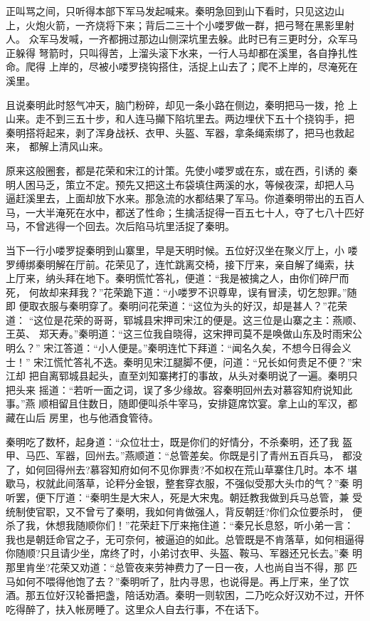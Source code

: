 正叫骂之间，只听得本部下军马发起喊来。秦明急回到山下看时，只见这边山
上，火炮火箭，一齐烧将下来；背后二三十个小喽罗做一群，把弓弩在黑影里射人。
众军马发喊，一齐都拥过那边山侧深坑里去躲。此时已有三更时分，众军马正躲得
弩箭时，只叫得苦，上溜头滚下水来，一行人马却都在溪里，各自挣扎性命。爬得
上岸的，尽被小喽罗挠钩搭住，活捉上山去了；爬不上岸的，尽淹死在溪里。

且说秦明此时怒气冲天，脑门粉碎，却见一条小路在侧边，秦明把马一拨，抢
上山来。走不到三五十步，和人连马攧下陷坑里去。两边埋伏下五十个挠钩手，把
秦明搭将起来，剥了浑身战袄、衣甲、头盔、军器，拿条绳索绑了，把马也救起来，
都解上清风山来。

原来这般圈套，都是花荣和宋江的计策。先使小喽罗或在东，或在西，引诱的
秦明人困马乏，策立不定。预先又把这土布袋填住两溪的水，等候夜深，却把人马
逼赶溪里去，上面却放下水来。那急流的水都结果了军马。你道秦明带出的五百人
马，一大半淹死在水中，都送了性命；生擒活捉得一百五七十人，夺了七八十匹好
马，不曾逃得一个回去。次后陷马坑里活捉了秦明。

当下一行小喽罗捉秦明到山寨里，早是天明时候。五位好汉坐在聚义厅上，小
喽罗缚绑秦明解在厅前。花荣见了，连忙跳离交椅，接下厅来，亲自解了绳索，扶
上厅来，纳头拜在地下。秦明慌忙答礼，便道：“我是被擒之人，由你们碎尸而死，
何故却来拜我？”花荣跪下道：“小喽罗不识尊卑，误有冒渎，切乞恕罪。”随即
便取衣服与秦明穿了。秦明问花荣道：“这位为头的好汉，却是甚人？”花荣道：
“这位是花荣的哥哥，郓城县宋押司宋江的便是。这三位是山寨之主：燕顺、王英、
郑天寿。”秦明道：“这三位我自晓得，这宋押司莫不是唤做山东及时雨宋公明么？”
宋江答道：“小人便是。”秦明连忙下拜道：“闻名久矣，不想今日得会义士！”
宋江慌忙答礼不迭。秦明见宋江腿脚不便，问道：“兄长如何贵足不便？”宋江却
把自离郓城县起头，直至刘知寨拷打的事故，从头对秦明说了一遍。秦明只把头来
摇道：“若听一面之词，误了多少缘故。容秦明回州去对慕容知府说知此事。”燕
顺相留且住数日，随即便叫杀牛宰马，安排筵席饮宴。拿上山的军汉，都藏在山后
房里，也与他酒食管待。

秦明吃了数杯，起身道：“众位壮士，既是你们的好情分，不杀秦明，还了我
盔甲、马匹、军器，回州去。”燕顺道：“总管差矣。你既是引了青州五百兵马，
都没了，如何回得州去?慕容知府如何不见你罪责?不如权在荒山草寨住几时。本不
堪歇马，权就此间落草，论秤分金银，整套穿衣服，不强似受那大头巾的气？”秦
明听罢，便下厅道：“秦明生是大宋人，死是大宋鬼。朝廷教我做到兵马总管，兼
受统制使官职，又不曾亏了秦明，我如何肯做强人，背反朝廷?你们众位要杀时，
便杀了我，休想我随顺你们！”花荣赶下厅来拖住道：“秦兄长息怒，听小弟一言：
我也是朝廷命官之子，无可奈何，被逼迫的如此。总管既是不肯落草，如何相逼得
你随顺?只且请少坐，席终了时，小弟讨衣甲、头盔、鞍马、军器还兄长去。”秦
明那里肯坐?花荣又劝道：“总管夜来劳神费力了一日一夜，人也尚自当不得，那
匹马如何不喂得他饱了去？”秦明听了，肚内寻思，也说得是。再上厅来，坐了饮
酒。那五位好汉轮番把盏，陪话劝酒。秦明一则软困，二乃吃众好汉劝不过，开怀
吃得醉了，扶入帐房睡了。这里众人自去行事，不在话下。

